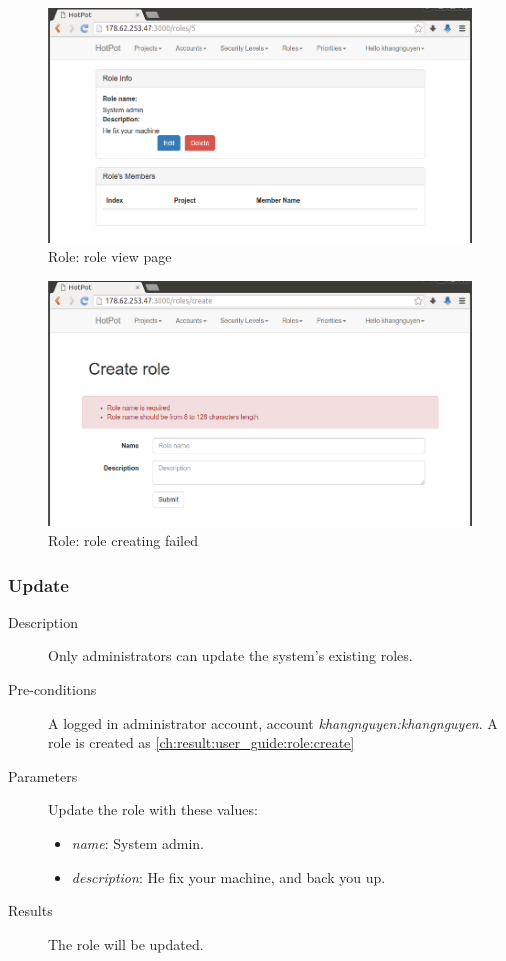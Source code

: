 \begin{figure}[bth]
\myfloatalign
\includegraphics[width=1.0\linewidth]{gfx/chapter_5/role/role_view}
\caption[Role: role view page]{Role: role view page}
\label{fig:user_guide:role:role_view}
\end{figure}

\begin{figure}[bth]
\myfloatalign
\includegraphics[width=1.0\linewidth]{gfx/chapter_5/role/role_create_failed}
\caption[Role: role create]{Role: role creating failed}
\label{fig:user_guide:role:role_create_failed}
\end{figure}

\clearpage

\subsubsection{Update}
\label{ch:result:user_guide:role:update}

\begin{description}
\item[Description] Only administrators can update the system's existing roles.
\item[Pre-conditions] A logged in administrator account, \eg account \emph{khangnguyen:khangnguyen}.
A role is created as \autoref{ch:result:user_guide:role:create}
\item[Parameters] Update the role with these values:
\begin{itemize}
\item \emph{name}: System admin.
\item \emph{description}: He fix your machine, and back you up.
\end{itemize}
\item[Results] The role will be updated.
\end{description}

